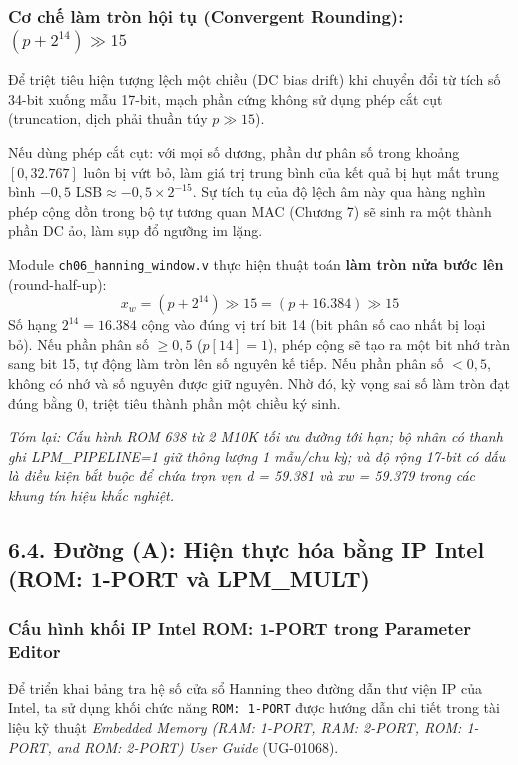 \subsubsection*{Cơ chế làm tròn hội tụ (Convergent Rounding): $(p + 2^{14}) \gg 15$}
Để triệt tiêu hiện tượng lệch một chiều (DC bias drift) khi chuyển đổi từ tích số 34-bit xuống mẫu 17-bit, mạch phần cứng không sử dụng phép cắt cụt (truncation, dịch phải thuần túy $p \gg 15$). 

Nếu dùng phép cắt cụt: với mọi số dương, phần dư phân số trong khoảng $[0, 32.767]$ luôn bị vứt bỏ, làm giá trị trung bình của kết quả bị hụt mất trung bình $-0{,}5\text{ LSB} \approx -0{,}5 \times 2^{-15}$. Sự tích tụ của độ lệch âm này qua hàng nghìn phép cộng dồn trong bộ tự tương quan MAC (Chương 7) sẽ sinh ra một thành phần DC ảo, làm sụp đổ ngưỡng im lặng.

Module \texttt{ch06\_hanning\_window.v} thực hiện thuật toán \textbf{làm tròn nửa bước lên} (round-half-up):
\begin{equation}
x_w = (p + 2^{14}) \gg 15 = (p + 16.384) \gg 15
\end{equation}
Số hạng $2^{14} = 16.384$ cộng vào đúng vị trí bit 14 (bit phân số cao nhất bị loại bỏ). Nếu phần phân số $\ge 0{,}5$ ($p[14] = 1$), phép cộng sẽ tạo ra một bit nhớ tràn sang bit 15, tự động làm tròn lên số nguyên kế tiếp. Nếu phần phân số $< 0{,}5$, không có nhớ và số nguyên được giữ nguyên. Nhờ đó, kỳ vọng sai số làm tròn đạt đúng bằng $0$, triệt tiêu thành phần một chiều ký sinh.

\textit{Tóm lại: Cấu hình ROM 638 từ 2 M10K tối ưu đường tới hạn; bộ nhân có thanh ghi LPM\_PIPELINE=1 giữ thông lượng 1 mẫu/chu kỳ; và độ rộng 17-bit có dấu là điều kiện bắt buộc để chứa trọn vẹn d = 59.381 và xw = 59.379 trong các khung tín hiệu khắc nghiệt.}


\subsection*{6.4. Đường (A): Hiện thực hóa bằng IP Intel (ROM: 1-PORT và LPM\_MULT)}

\subsubsection*{Cấu hình khối IP Intel ROM: 1-PORT trong Parameter Editor}
Để triển khai bảng tra hệ số cửa sổ Hanning theo đường dẫn thư viện IP của Intel, ta sử dụng khối chức năng \texttt{ROM: 1-PORT} được hướng dẫn chi tiết trong tài liệu kỹ thuật \emph{Embedded Memory (RAM: 1-PORT, RAM: 2-PORT, ROM: 1-PORT, and ROM: 2-PORT) User Guide} (UG-01068).

